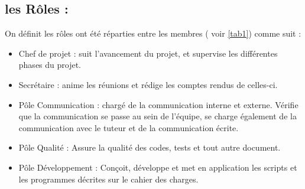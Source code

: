 \documentclass[12pt]{article}
\begin{document}
\subsection{les Rôles :}
On définit les rôles ont été réparties entre les membres ( voir \ref{tab1}) comme suit :
\begin{itemize}
    \item Chef de projet : suit l'avancement du projet, et supervise les différentes phases du projet.
    \item Secrétaire : anime les réunions et rédige les comptes rendus de celles-ci.
    \item Pôle Communication : chargé de la communication interne et externe. Vérifie que la communication se passe au sein de l'équipe, se charge également de la communication avec le tuteur et de la communication écrite.
    \item Pôle Qualité : Assure la qualité des codes, tests et tout autre document. 
    \item Pôle Développement : Conçoit, développe et met en application les scripts et les programmes décrites sur le cahier des charges.
\end{itemize}
\begin{center}
\end{center}
\end{document}
